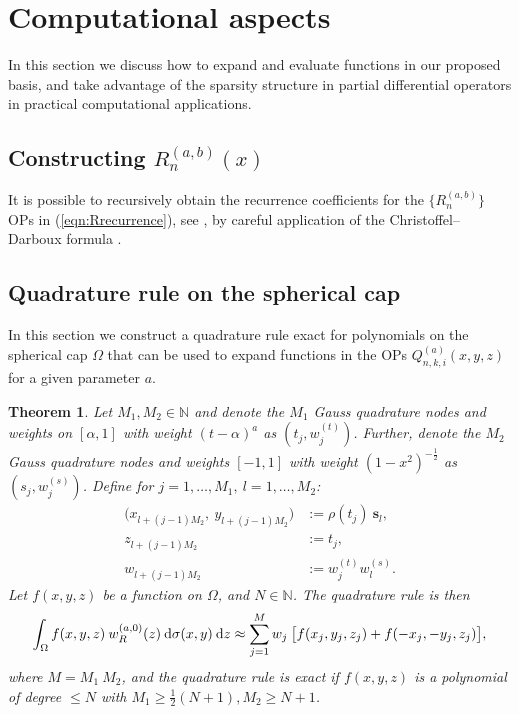 \documentclass[11pt, oneside]{article}   	%
\newcommand{\half}{\frac{1}{2}}
\newcommand{\N}{\mathbb{N}}
\newcommand{\genjac}{R}
\newcommand{\genjacw}{w_\genjac}
\newcommand{\scop}{Q}
\newcommand{\scopnki}{\scop_{n,k,i}}
\newcommand{\scopnkia}{\scopnki^{(a)}}
\newtheorem{theorem}{Theorem}
\begin{document}
%
\section{Computational aspects}\label{Section:Computation}

In this section we discuss how to expand and evaluate functions in our proposed basis, and take advantage of the sparsity structure in partial differential operators in practical computational applications.


\subsection{Constructing $\genjac_n^{(a,b)}(x)$}

It is possible to recursively obtain the recurrence coefficients for the $\{\genjac_n^{(a,b)}\}$ OPs in (\ref{eqn:Rrecurrence}), see \cite{snowball2019sparse}, by careful application of the Christoffel--Darboux formula \cite[18.2.12]{DLMF}.


\subsection{Quadrature rule on the spherical cap}\label{subsection:quadrule}

In this section we construct a quadrature rule exact for polynomials on the spherical cap $\Omega$ that can be used to expand functions in the OPs $\scopnkia(x,y,z)$ for a given parameter $a$.

\begin{theorem}\label{Theorem:quadrule}
Let $M_1, M_2 \in \N$ and denote the $M_1$ Gauss quadrature nodes and weights on $[\alpha,1]$ with weight $(t - \alpha)^a$ as $(t_j, w_j^{(t)})$. Further, denote the $M_2$ Gauss quadrature nodes and weights $[-1,1]$ with weight $(1 - x^2)^{-\half}$ as $(s_j, w_j^{(s)})$.
Define for $j = 1,\dots,M_1, \: l=1,\dots,M_2$:
\begin{align*}
	\big(x_{l+(j-1)M_2}, \: y_{l+(j-1)M_2} \big) &:= \rho(t_j) \: \mathbf{s}_l, \\
	z_{l+(j-1)M_2} &:= t_j, \\
	w_{l+(j-1)M_2} &:= w_j^{(t)} w_l^{(s)}.
\end{align*}
Let $f(x,y,z)$ be a function on $\Omega$, and $N \in \N$. The quadrature rule is then
\begin{align*}
	\int_\Omega f(x,y,z) \: \genjacw^{(a,0)}(z) \: \D \sigma(x,y) \: \D z \approx \sum_{j=1}^{M} w_j \: \big[ f(x_j, y_j, z_j) + f(-x_j, -y_j, z_j) \big],
\end{align*}
where $M = M_1 \: M_2$, and the quadrature rule is exact if $f(x,y,z)$ is a polynomial of degree $\le N$ with $M_1 \ge \half (N+1), M_2 \ge N+1$.
\end{theorem}
\end{document}
